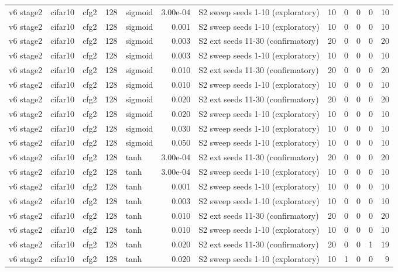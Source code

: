 \begin{table}[htbp]
{\begin{tabular}{@{}lllrlrlrrrrr@{}}
v6 stage2 & cifar10 & cfg2 & 128 & sigmoid & 3.00e-04 & S2 sweep seeds 1-10 (exploratory) & 10 & 0 & 0 & 0 & 10 \\
v6 stage2 & cifar10 & cfg2 & 128 & sigmoid & 0.001 & S2 sweep seeds 1-10 (exploratory) & 10 & 0 & 0 & 0 & 10 \\
v6 stage2 & cifar10 & cfg2 & 128 & sigmoid & 0.003 & S2 ext seeds 11-30 (confirmatory) & 20 & 0 & 0 & 0 & 20 \\
v6 stage2 & cifar10 & cfg2 & 128 & sigmoid & 0.003 & S2 sweep seeds 1-10 (exploratory) & 10 & 0 & 0 & 0 & 10 \\
v6 stage2 & cifar10 & cfg2 & 128 & sigmoid & 0.010 & S2 ext seeds 11-30 (confirmatory) & 20 & 0 & 0 & 0 & 20 \\
v6 stage2 & cifar10 & cfg2 & 128 & sigmoid & 0.010 & S2 sweep seeds 1-10 (exploratory) & 10 & 0 & 0 & 0 & 10 \\
v6 stage2 & cifar10 & cfg2 & 128 & sigmoid & 0.020 & S2 ext seeds 11-30 (confirmatory) & 20 & 0 & 0 & 0 & 20 \\
v6 stage2 & cifar10 & cfg2 & 128 & sigmoid & 0.020 & S2 sweep seeds 1-10 (exploratory) & 10 & 0 & 0 & 0 & 10 \\
v6 stage2 & cifar10 & cfg2 & 128 & sigmoid & 0.030 & S2 sweep seeds 1-10 (exploratory) & 10 & 0 & 0 & 0 & 10 \\
v6 stage2 & cifar10 & cfg2 & 128 & sigmoid & 0.050 & S2 sweep seeds 1-10 (exploratory) & 10 & 0 & 0 & 0 & 10 \\
v6 stage2 & cifar10 & cfg2 & 128 & tanh & 3.00e-04 & S2 ext seeds 11-30 (confirmatory) & 20 & 0 & 0 & 0 & 20 \\
v6 stage2 & cifar10 & cfg2 & 128 & tanh & 3.00e-04 & S2 sweep seeds 1-10 (exploratory) & 10 & 0 & 0 & 0 & 10 \\
v6 stage2 & cifar10 & cfg2 & 128 & tanh & 0.001 & S2 sweep seeds 1-10 (exploratory) & 10 & 0 & 0 & 0 & 10 \\
v6 stage2 & cifar10 & cfg2 & 128 & tanh & 0.003 & S2 sweep seeds 1-10 (exploratory) & 10 & 0 & 0 & 0 & 10 \\
v6 stage2 & cifar10 & cfg2 & 128 & tanh & 0.010 & S2 ext seeds 11-30 (confirmatory) & 20 & 0 & 0 & 0 & 20 \\
v6 stage2 & cifar10 & cfg2 & 128 & tanh & 0.010 & S2 sweep seeds 1-10 (exploratory) & 10 & 0 & 0 & 0 & 10 \\
v6 stage2 & cifar10 & cfg2 & 128 & tanh & 0.020 & S2 ext seeds 11-30 (confirmatory) & 20 & 0 & 0 & 1 & 19 \\
v6 stage2 & cifar10 & cfg2 & 128 & tanh & 0.020 & S2 sweep seeds 1-10 (exploratory) & 10 & 1 & 0 & 0 & 9 \\

\end{tabular}}
\end{table}
